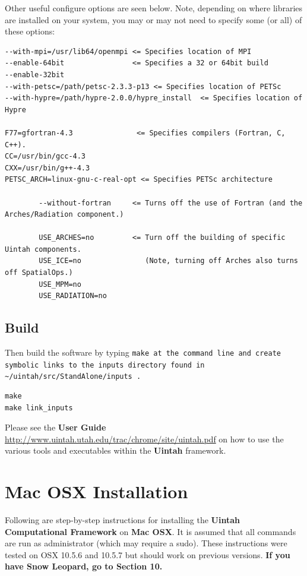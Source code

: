 \documentclass[12pt]{article}
\newcommand{\TT}[1]{\tt{#1} \normalfont}
\begin{document}
Other useful configure options are seen below.  Note, depending on
where libraries are installed on your system, you may or may not need
to specify some (or all) of these options:

\begin{verbatim}
--with-mpi=/usr/lib64/openmpi <= Specifies location of MPI
--enable-64bit                <= Specifies a 32 or 64bit build
--enable-32bit
--with-petsc=/path/petsc-2.3.3-p13 <= Specifies location of PETSc
--with-hypre=/path/hypre-2.0.0/hypre_install  <= Specifies location of Hypre

F77=gfortran-4.3               <= Specifies compilers (Fortran, C, C++).
CC=/usr/bin/gcc-4.3
CXX=/usr/bin/g++-4.3
PETSC_ARCH=linux-gnu-c-real-opt <= Specifies PETSc architecture

        --without-fortran     <= Turns off the use of Fortran (and the Arches/Radiation component.)

        USE_ARCHES=no         <= Turn off the building of specific Uintah components.
        USE_ICE=no               (Note, turning off Arches also turns off SpatialOps.)
        USE_MPM=no
        USE_RADIATION=no

\end{verbatim}


\subsection{Build}

Then build the software by typing \TT{make} at the command line and create symbolic links to the inputs directory found in \TT{\textasciitilde/uintah/src/StandAlone/inputs}.
\begin{verbatim}
make
make link_inputs
\end{verbatim}

Please see the \textbf{User Guide}
\url{http://www.uintah.utah.edu/trac/chrome/site/uintah.pdf} on how to use
the various tools and executables within the \textbf{Uintah}
framework.

\section{Mac OSX Installation}

Following are step-by-step instructions for installing the
\textbf{Uintah Computational Framework} on \textbf{Mac OSX}.  It is
assumed that all commands are run as administrator (which may require
a sudo).  These instructions were tested on OSX 10.5.6 and 10.5.7 but
should work on previous versions.  \textbf{If you have Snow Leopard,
go to Section 10.}
\end{document}
